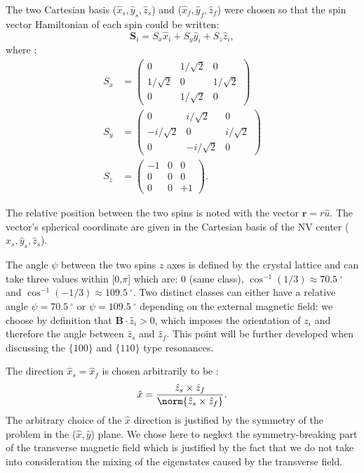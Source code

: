 \documentclass[a4paper,11pt]{report}
\begin{document}
The two Cartesian basis ($\hat x_s,\hat y_s,\hat z_s$) and ($\hat x_f,\hat y_f,\hat z_f$) were chosen so that the spin vector Hamiltonian of each spin could be written:
\begin{equation}
\mathbf{S}_i=S_x \hat x_i + S_y \hat{y}_i + S_z \hat{z}_i,
\end{equation}
where :
\begin{align*}
S_x&=\begin{pmatrix}
0&1/\sqrt{2}&0 \\
1/\sqrt{2}&0&1/\sqrt{2} \\
0&1/\sqrt{2}&0
\end{pmatrix} \\
S_y&=\begin{pmatrix}
0&i/\sqrt{2}&0 \\
-i/\sqrt{2}&0&i/\sqrt{2} \\
0&-i/\sqrt{2}&0
\end{pmatrix} \\
S_z&=\begin{pmatrix}
-1&0&0 \\
0&0&0 \\
0&0&+1
\end{pmatrix}.
\end{align*}

The relative position between the two spins is noted with the vector $\mathbf{r}=r\hat{u}$. The vector's spherical coordinate are given in the Cartesian basis of the NV center ($\hat x_s,\hat y_s,\hat z_s$).

The angle $\psi$ between the two spins $z$ axes is defined by the crystal lattice and can take three values within [0,$\pi$] which are: 0 (same class), $\cos^{-1}(1/3) \approx 70.5\ ^\circ$ and $\cos^{-1}(-1/3) \approx 109.5\ ^\circ$. Two distinct classes can either have a relative angle $\psi=70.5 \ ^\circ$ or $\psi=109.5 \ ^\circ$ depending on the external magnetic field: we choose by definition that $\mathbf{B}\cdot\hat{z}_i >0$, which imposes the orientation of $z_i$ and therefore the angle between $\hat z_s$ and $\hat z_f$. This point will be further developed when discussing the $\{100\}$ and $\{110\}$ type resonances.

The direction $\hat x_s=\hat x_f$ is chosen arbitrarily to be : $$\hat x=\frac{\hat z_s \times \hat z_f}{\norm{\hat z_s \times \hat z_f}}.$$
The arbitrary choice of the $\hat x$ direction is justified by the symmetry of the problem in the ($\hat x, \hat y$) plane. We chose here to neglect the symmetry-breaking part of the transverse magnetic field which is justified by the fact that we do not take into consideration the mixing of the eigenstates caused by the transverse field.
\end{document}
